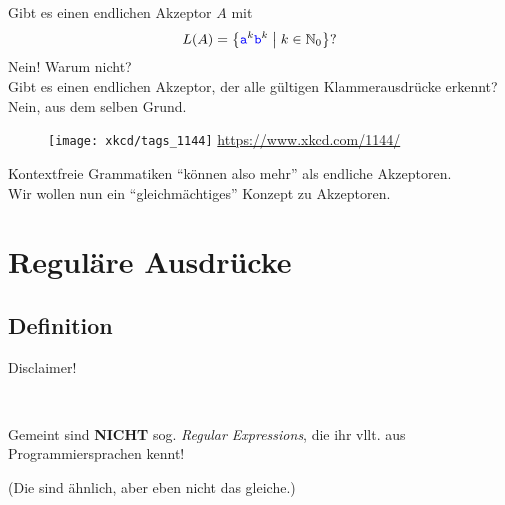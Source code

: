 

\begin{frame}[t]
	Gibt es einen endlichen Akzeptor $A$ mit $$L(A) = \left\{ \hbox{\textcolor{blue}{\texttt{a}}}^k\hbox{\textcolor{blue}{\texttt{b}}}^k \;\middle|\; k\in \mathbb{N}_0 \right\}?$$
	\pause
	Nein! Warum nicht? \\
	
	Gibt es einen endlichen Akzeptor, der alle gültigen Klammerausdrücke erkennt?\\ \pause
	Nein, aus dem selben Grund.
	\begin{figure}[H]
		\centering
		\texttt{[image: xkcd/tags\_1144]}
		{ {\url{https://www.xkcd.com/1144/}} }
	\end{figure}
	\pause
	Kontextfreie Grammatiken \enquote{können also mehr} als endliche Akzeptoren.\\
	Wir wollen nun ein \enquote{gleichmächtiges} Konzept zu Akzeptoren.
\end{frame}

\section{Reguläre Ausdrücke}
\subsection{Definition}

\begin{frame}{Disclaimer!}
	\begin{center}
		\Large
			 \\ \medskip
		
		Gemeint sind \textbf{NICHT} sog. \emph{Regular Expressions}, die ihr vllt. aus Programmiersprachen kennt! \\ \bigskip
		
		{\normalsize (Die sind ähnlich, aber eben nicht das gleiche.)}
	\end{center}
\end{frame}

